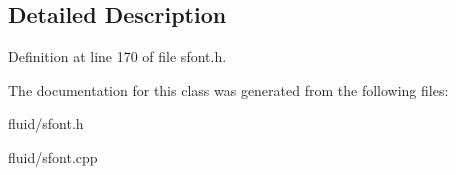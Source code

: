 \subsection{Detailed Description}


Definition at line 170 of file sfont.\+h.



The documentation for this class was generated from the following files\+:\begin{DoxyCompactItemize}
\item 
fluid/sfont.\+h\item 
fluid/sfont.\+cpp\end{DoxyCompactItemize}
